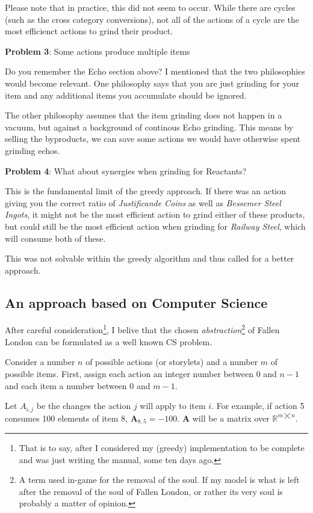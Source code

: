 \documentclass[a4paper,11pt,openright,twoside]{scrartcl}
\begin{document}
Please note that in practice, this did not seem to occur. While there are cycles (such as the cross category conversions), not all of the actions of a cycle are the most efficienct actions to grind their product. 


\textbf{Problem 3}: Some actions produce multiple items

Do you remember the Echo section above? I mentioned that the two philosophies would become relevant. One philosophy says that you are just grinding for your item and any additional items you accumulate should be ignored. 

The other philosophy assumes that the item grinding does not happen in a vacuum, but against a background of continous Echo grinding. This means by selling the byproducts, we can save some actions we would have otherwise spent grinding echos.

\textbf{Problem 4}: What about synergies when grinding for Reactants?

This is the fundamental limit of the greedy approach. If there was an action giving you the correct ratio of \emph{Justificande Coins} as well as \emph{Bessemer Steel Ingots}, it might not be the most efficient action to grind either of these products, but could still be the most efficient action when grinding for \emph{Railway Steel}, which will consume both of these.

This was not solvable within the greedy algorithm and thus called for a better approach. 

\subsection{An approach based on Computer Science}

After careful consideration\footnote{That is to say, after I considered my (greedy) implementation to be complete and was just writing the manual, some ten days ago.}, I belive that the chosen \emph{abstraction}\footnote{A term used in-game for the removal of the soul. If my model is what is left after the removal of the soul of Fallen London, or rather its very soul is probably a matter of opinion.} of Fallen London can be formulated as a well known CS problem. 


Consider a number $n$ of possible actions (or storylets) and a number $m$ of possible items. First, assign each action an integer number between $0$ and $n-1$ and each item a number between $0$ and $m-1$.

Let $A_{i,j}$ be the changes the action $j$ will apply to item $i$. For example, if action 5 consumes 100 elements of item 8, $\mathbf{A}_{8,5}=-100$.  $\mathbf{A}$ will be a matrix over $\mathbb{R}^{m \bigtimes n}$. 
\end{document}
